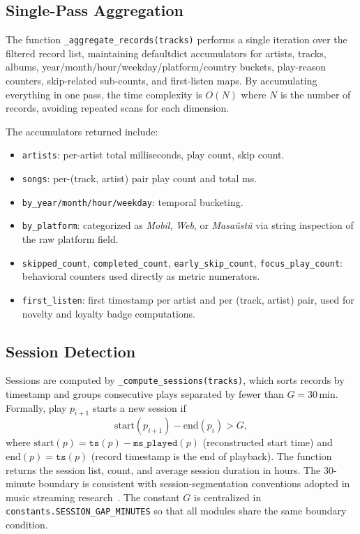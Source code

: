 \documentclass[conference]{IEEEtran}
\begin{document}
\subsection{Single-Pass Aggregation}

The function \texttt{\_aggregate\_records(tracks)} performs a single
iteration over the filtered record list, maintaining defaultdict accumulators
for artists, tracks, albums, year/month/hour/weekday/platform/country
buckets, play-reason counters, skip-related sub-counts, and first-listen
maps. By accumulating everything in one pass, the time complexity is
$O(N)$ where $N$ is the number of records, avoiding repeated scans for
each dimension.

The accumulators returned include:
\begin{itemize}
  \item \texttt{artists}: per-artist total milliseconds, play count, skip count.
  \item \texttt{songs}: per-(track, artist) pair play count and total ms.
  \item \texttt{by\_year/month/hour/weekday}: temporal bucketing.
  \item \texttt{by\_platform}: categorized as \textit{Mobil}, \textit{Web},
        or \textit{Masaüstü} via string inspection of the raw platform field.
  \item \texttt{skipped\_count}, \texttt{completed\_count},
        \texttt{early\_skip\_count}, \texttt{focus\_play\_count}: behavioral
        counters used directly as metric numerators.
  \item \texttt{first\_listen}: first timestamp per artist and per
        (track, artist) pair, used for novelty and loyalty badge computations.
\end{itemize}

\subsection{Session Detection}

Sessions are computed by \texttt{\_compute\_sessions(tracks)}, which
sorts records by timestamp and groups consecutive plays separated by fewer
than $G = 30$\,min. Formally, play $p_{i+1}$ starts a new session if
\begin{equation}
  \mathrm{start}(p_{i+1}) - \mathrm{end}(p_i) > G,
\end{equation}
where $\mathrm{start}(p) = \texttt{ts}(p) - \texttt{ms\_played}(p)$
(reconstructed start time) and $\mathrm{end}(p) = \texttt{ts}(p)$
(record timestamp is the end of playback). The function returns the session
list, count, and average session duration in hours.
The 30-minute boundary is consistent with session-segmentation conventions
adopted in music streaming research~\cite{brost2019sessions}. The constant
$G$ is centralized in \texttt{constants.SESSION\_GAP\_MINUTES} so that all
modules share the same boundary condition.
\end{document}

